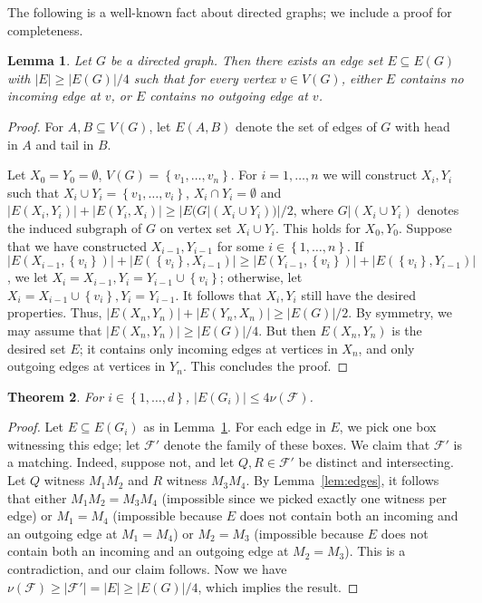\documentclass[12pt]{amsart}
\theoremstyle{plain}
\newtheorem{theorem}{Theorem}[section]
\newtheorem{lemma}[theorem]{Lemma}
\theoremstyle{definition}
\theoremstyle{remark}
\newcommand{\F}{\mathcal{F}}
\newcommand{\sset}[1]{\left\{#1\right\}}
\begin{document}
The following is a well-known fact about directed graphs; we include a proof for completeness. 
\begin{lemma} \label{lem:digraph} Let $G$ be a directed graph. Then there exists an edge set $E \subseteq E(G)$ with $|E| \geq |E(G)|/4$ such that for every vertex $v \in V(G)$, either $E$ contains no incoming edge at $v$, or $E$ contains no outgoing edge at $v$. 
\end{lemma}
\begin{proof}
For $A, B \subseteq V(G)$, let $E(A, B)$ denote the set of edges of $G$ with head in $A$ and tail in $B$. 

Let $X_0 = Y_0 = \emptyset$, $V(G) = \sset{v_1, \dots, v_n}$. For $i=1, \dots, n$ we will construct $X_i, Y_i$ such that $X_i \cup Y_i = \sset{v_1, \dots, v_i}$, $X_i \cap Y_i = \emptyset$ and $|E(X_i, Y_i)| + |E(Y_i, X_i)| \geq |E(G|(X_i \cup Y_i))|/2$, where $G|(X_i \cup Y_i)$ denotes the induced subgraph of $G$ on vertex set $X_i \cup Y_i$. This holds for $X_0, Y_0$. Suppose that we have constructed $X_{i-1}, Y_{i-1}$ for some $i \in \sset{1, \dots, n}$. If $|E(X_{i-1}, \sset{v_i})| + |E(\sset{v_i}, X_{i-1})| \geq |E(Y_{i-1}, \sset{v_i})| + |E(\sset{v_i}, Y_{i-1})|$, we let $X_i = X_{i-1}, Y_i = Y_{i-1} \cup \sset{v_i}$; otherwise, let $X_i = X_{i-1} \cup \sset{v_i}, Y_i = Y_{i-1}$. It follows that $X_i, Y_i$ still have the desired properties. Thus, $|E(X_n, Y_n)| + |E(Y_n, X_n)| \geq |E(G)|/2$. By symmetry, we may assume that $|E(X_n, Y_n)| \geq |E(G)|/4$. But then $E(X_n, Y_n)$ is the desired set $E$; it contains only incoming edges at vertices in $X_n$, and only outgoing edges at vertices in $Y_n$. This concludes the proof. 
\end{proof}

\begin{theorem}\label{thm:edges} For $i \in \sset{1,\dots, d}$, $|E(G_i)| \leq 4 \nu(\F)$. 
\end{theorem}
\begin{proof}
Let $E \subseteq E(G_i)$ as in Lemma~\ref{lem:digraph}. For each edge in $E$, we pick one box witnessing this edge; let $\F'$ denote the family of these boxes. We claim that $\F'$ is a matching. Indeed, suppose not, and let $Q, R \in \F'$ be distinct and intersecting. Let $Q$ witness $M_1M_2$ and $R$ witness $M_3M_4$. By Lemma~\ref{lem:edges}, it follows that either $M_1M_2 = M_3M_4$ (impossible since we picked exactly one witness per edge) or $M_1 = M_4$ (impossible because $E$ does not contain both an incoming and an outgoing edge at $M_1 = M_4$) or  $M_2 = M_3$ (impossible because $E$ does not contain both an incoming and an outgoing edge at $M_2 = M_3$). This is a contradiction, and our claim follows. Now we have $\nu(\F) \geq |\F'| = |E| \geq |E(G)|/4$, which implies the result. 
\end{proof}
\end{document}

